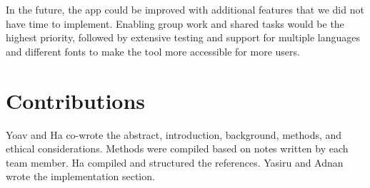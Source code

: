 \documentclass[11pt,oneside]{article}
\begin{document}
In the future, the app could be improved with additional features that we did not have time to implement. Enabling group work and shared tasks would be the highest priority, followed by extensive testing and support for multiple languages and different fonts to make the tool more accessible for more users.


\section{Contributions}
Yoav and Ha co-wrote the abstract, introduction, background, methods, and ethical considerations. Methods were compiled based on notes written by each team member. Ha compiled and structured the references. Yasiru and Adnan wrote the implementation section.




\end{document}

